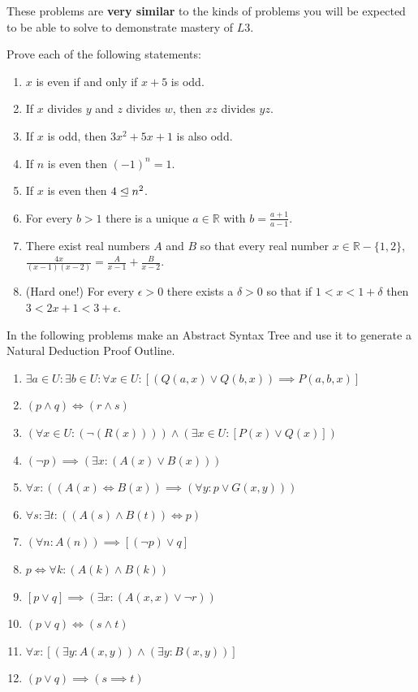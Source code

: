  These problems are \textbf{very similar} to the kinds of problems you will be expected to be able to solve to demonstrate mastery of $L3$.
 
\begin{xca}
	
	Prove each of the following statements:
	
		\begin{enumerate}
			\item $x$ is even if and only if $x+5$ is odd.
			\item If $x$ divides $y$ and $z$ divides $w$, then $xz$ divides $yz$.
			\item If $x$ is odd, then $3x^2+5x+1$ is also odd.
			\item If $n$ is even then $(-1)^n = 1$.
			\item If $x$ is even then $4 \trianglelefteq n^2$.
			\item For every $b >1$ there is a unique $a \in \mathbb{R}$ with $b = \frac{a+1}{a-1}$.
			\item There exist real numbers $A$ and $B$ so that every real number $x \in \mathbb{R} - \{1,2\}$, $\frac{4x}{(x-1)(x-2)} = \frac{A}{x-1} + \frac{B}{x-2}$.
			\item (Hard one!) For every $\epsilon >0$ there exists a $\delta >0$ so that if $1<x<1+\delta$ then $3<2x+1< 3+\epsilon$.
		\end{enumerate}
\end{xca}


\begin{xca}
		In the following problems make an Abstract Syntax Tree and use it to generate a Natural Deduction Proof Outline.
	\begin{enumerate}
			\item $\exists a \in U: \exists b \in U: \forall x \in U: [  (Q(a,x) \vee Q(b,x))\implies P(a,b,x)]$
			\item $(p \wedge q) \Longleftrightarrow (r \wedge s)$
			\item $(\forall x \in U: ( \neg(R(x)))) \wedge (\exists x \in U: [ P(x) \vee Q(x)])$
			\item $(\neg p) \implies (\exists x: (A(x) \vee B(x)))$
			\item $\forall x: ((A(x) \Longleftrightarrow B(x)) \implies (\forall y: p \vee G(x,y)))$
			\item $\forall s:  \exists t: ((A(s) \wedge B(t)) \Longleftrightarrow p)$
			\item $(\forall n: A(n)) \implies [(\neg p) \vee q] $
			\item $p \Longleftrightarrow \forall k:( A(k) \wedge B(k))$
			\item $[p \vee q] \implies (\exists x: (A(x,x) \vee \neg r))$
   			\item $(p \vee q) \Longleftrightarrow (s \wedge t)$
			\item $\forall x: [(\exists y: A(x,y)) \wedge (\exists y: B(x,y))]$
			\item $ (p \vee q) \implies (s \implies t)$
		\end{enumerate}
\end{xca}


			








